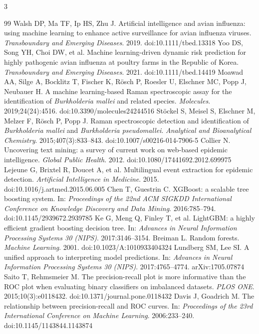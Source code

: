 \documentclass[10pt]{article}
\begin{document}
\begin{multicols}{3}
\begin{thebibliography}{99}
 Walsh DP, Ma TF, Ip HS, Zhu J. Artificial intelligence and avian influenza: using machine learning to enhance active surveillance for avian influenza viruses. \emph{Transboundary and Emerging Diseases}. 2019. doi:10.1111/tbed.13318
 Yoo DS, Song YH, Choi DW, et al. Machine learning-driven dynamic risk prediction for highly pathogenic avian influenza at poultry farms in the Republic of Korea. \emph{Transboundary and Emerging Diseases}. 2021. doi:10.1111/tbed.14419
 Moawad AA, Silge A, Bocklitz T, Fischer K, R\"osch P, Roesler U, Elschner MC, Popp J, Neubauer H. A machine learning-based Raman spectroscopic assay for the identification of \emph{Burkholderia mallei} and related species. \emph{Molecules}. 2019;24(24):4516. doi:10.3390/molecules24244516
 St\"ockel S, Meisel S, Elschner M, Melzer F, R\"osch P, Popp J. Raman spectroscopic detection and identification of \emph{Burkholderia mallei} and \emph{Burkholderia pseudomallei}. \emph{Analytical and Bioanalytical Chemistry}. 2015;407(3):833--843. doi:10.1007/s00216-014-7906-5
 Collier N. Uncovering text mining: a survey of current work on web-based epidemic intelligence. \emph{Global Public Health}. 2012. doi:10.1080/17441692.2012.699975
 Lejeune G, Brixtel R, Doucet A, et al. Multilingual event extraction for epidemic detection. \emph{Artificial Intelligence in Medicine}. 2015. doi:10.1016/j.artmed.2015.06.005
 Chen T, Guestrin C. XGBoost: a scalable tree boosting system. In: \emph{Proceedings of the 22nd ACM SIGKDD International Conference on Knowledge Discovery and Data Mining}. 2016:785--794. doi:10.1145/2939672.2939785
 Ke G, Meng Q, Finley T, et al. LightGBM: a highly efficient gradient boosting decision tree. In: \emph{Advances in Neural Information Processing Systems 30 (NIPS)}. 2017:3146--3154.
 Breiman L. Random forests. \emph{Machine Learning}. 2001. doi:10.1023/A:1010933404324
 Lundberg SM, Lee SI. A unified approach to interpreting model predictions. In: \emph{Advances in Neural Information Processing Systems 30 (NIPS)}. 2017:4765--4774. arXiv:1705.07874
 Saito T, Rehmsmeier M. The precision-recall plot is more informative than the ROC plot when evaluating binary classifiers on imbalanced datasets. \emph{PLOS ONE}. 2015;10(3):e0118432. doi:10.1371/journal.pone.0118432
 Davis J, Goadrich M. The relationship between precision-recall and ROC curves. In: \emph{Proceedings of the 23rd International Conference on Machine Learning}. 2006:233--240. doi:10.1145/1143844.1143874

\end{thebibliography}
\end{multicols}
\end{document}
